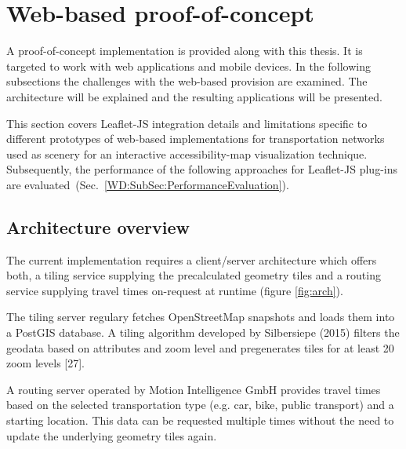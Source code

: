 
\cleardoublepage              %
\chapter{Web-based proof-of-concept}
  A proof-of-concept implementation is provided along with this thesis. It is targeted to work with web applications and mobile devices. In the following subsections the challenges with the web-based provision are examined. The architecture will be explained and the resulting applications will be presented.\par
  This section covers Leaflet-JS integration details and limitations specific to
  different prototypes of web-based implementations for transportation networks
  used as scenery for an interactive accessibility-map visualization technique.
  Subsequently, the performance of the following approaches for Leaflet-JS plug-ins
  are evaluated~(Sec.~\ref{WD:SubSec:PerformanceEvaluation}).\par
  \section{Architecture overview}
    The current implementation requires a client/server architecture which offers both, a tiling service supplying the precalculated geometry tiles and a routing service supplying travel times on-request at runtime (figure \ref{fig:arch}).


    The tiling server regulary fetches OpenStreetMap snapshots and loads them into a PostGIS database. A tiling algorithm developed by Silbersiepe (2015) filters the geodata based on attributes and zoom level and pregenerates tiles for at least 20 zoom levels [27].\par
    A routing server operated by Motion Intelligence GmbH provides travel times based on the selected transportation type (e.g. car, bike, public transport) and a starting location. This data can be requested multiple times without the need to update the underlying geometry tiles again.\par

